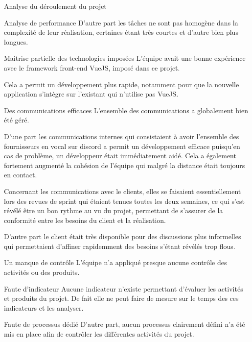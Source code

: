 \documentclass[]{article}
\begin{document}
{\begin{section}{Analyse du déroulement du projet}
\begin{subsection}{Analyse de performance}
     D'autre part les tâches ne sont pas homogène dans la complexité de leur réalisation, certaines étant très courtes et d'autre bien plus longues.
 \end{subsection}

 \begin{subsection}{Maitrise partielle des technologies imposées }
     L'équipe avait une bonne expérience avec le framework front-end VueJS, imposé dans ce projet.

     Cela a permit un développement plus rapide, notamment pour que la nouvelle application s'intègre sur l'existant qui n'utilise pas VueJS.
 \end{subsection}

 \begin{subsection}{Des communications efficaces}
     L'ensemble des communications a globalement bien été géré.

     D'une part les communications internes qui consistaient à avoir l'ensemble des fournisseurs en vocal sur discord a permit un développement efficace puisqu'en cas de problème, un développeur était immédiatement aidé. Cela a également fortement augmenté la cohésion de l'équipe qui malgré la distance était toujours en contact.

     Concernant les communications avec le clients, elles se faisaient essentiellement lors des revues de sprint qui étaient tenues toutes les deux semaines, ce qui s'est révélé être un bon rythme au vu du projet, permettant de s'assurer de la conformité entre les besoins du client et la réalisation.

     D'autre part le client était très disponible pour des discussions plus informelles qui permettaient d'affiner rapidemment des besoins s'étant révélés trop flous.
 \end{subsection}

 \begin{subsection}{Un manque de contrôle}
     L'équipe n'a appliqué presque aucune contrôle des activités ou des produits.
     \begin{subsubsection}{Faute d'indicateur}
         Aucune indicateur n'existe permettant d'évaluer les activités et produits du projet. De fait elle ne peut faire de mesure sur le temps des ces indicateurs et les analyser.
     \end{subsubsection}

     \begin{subsubsection}{Faute de processus dédié}
         D'autre part, aucun processus clairement défini n'a été mis en place afin de contrôler les différentes activités du projet.
     \end{subsubsection}


\end{subsection}
\end{section}}
\end{document}
